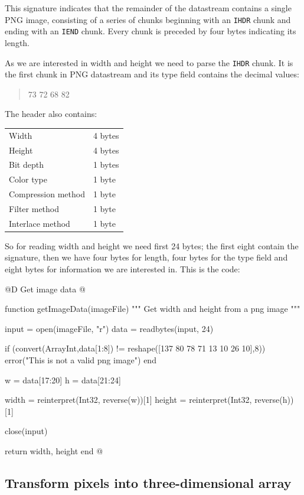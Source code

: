 \documentclass[11pt,oneside]{article}	%
\begin{document}
This signature indicates that the remainder of the datastream contains a single PNG image, consisting of a series of chunks beginning with an \texttt{IHDR} chunk and ending with an \texttt{IEND} chunk. Every chunk is preceded by four bytes indicating its length.

As we are interested in width and height we need to parse the \texttt{IHDR} chunk. It is the first chunk in PNG datastream and its type field contains the decimal values:

\begin{quote}
 73 72 68 82
\end{quote}

The header also contains:\\

\begin{tabular}{l l}
  Width & 4 bytes\\
  Height & 4 bytes\\
  Bit depth & 1 bytes\\
  Color type & 1 byte\\
  Compression method & 1 byte\\
  Filter method & 1 byte\\
  Interlace method & 1 byte\\
\end{tabular}
\newline

So for reading width and height we need first 24 bytes; the first eight contain the signature, then we have four bytes for length, four bytes for the type field and eight bytes for information we are interested in. This is the code:

@D Get image data
@{function getImageData(imageFile)
  """
  Get width and height from a png image
  """

  input = open(imageFile, "r")
  data = readbytes(input, 24)
  
  if (convert(Array{Int},data[1:8]) != reshape([137 80 78 71 13 10 26 10],8))
    error("This is not a valid png image")
  end

  w = data[17:20]
  h = data[21:24]

  width = reinterpret(Int32, reverse(w))[1]
  height = reinterpret(Int32, reverse(h))[1]

  close(input)

  return width, height
end
@}

\subsection{Transform pixels into three-dimensional array}\label{sec:transformation}
\end{document}
